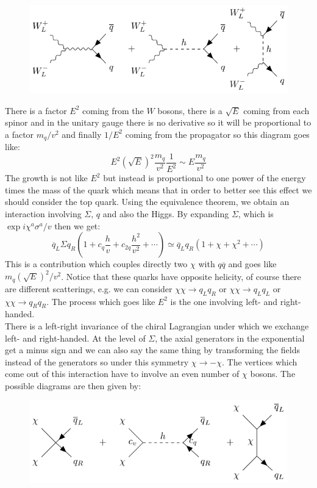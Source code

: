 \documentclass[../main.tex]{subfiles}
\begin{document}
\begin{figure}[h]
    \centering
    \includegraphics{Images/wwqq.pdf}
    \caption*{}
\end{figure}
There is a factor $E^2$ coming from the $W$ bosons, there is a $\sqrt{E}$ coming from each spinor and in the unitary gauge there is no derivative so it will be proportional to a factor $m_q/v^2$ and finally $1/E^2$ coming from the propagator so this diagram goes like:
\[
E^2(\sqrt{E})^2\frac{m_q}{v^2}\frac{1}{E^2}\sim E\frac{m_q}{v^2}
\]
The growth is not like $E^2$ but instead is proportional to one power of the energy times the mass of the quark which means that in order to better see this effect we should consider the top quark. Using the equivalence theorem, we obtain an interaction involving $\Sigma$, $q$ and also the Higgs. By expanding $\Sigma$, which is $\exp{i\chi^a\sigma^a/v}$ then we get:
\[
\overline{q}_L\Sigma q_R\left(1+c_q\frac{h}{v}+c_{2q}\frac{h^2}{v^2}+\cdots\right)\simeq\overline{q}_Lq_R(1+\chi+\chi^2+\cdots)
\]
This is a contribution which couples directly two $\chi$ with $q\overline{q}$ and goes like $m_q(\sqrt{E})^2/v^2$. Notice that these quarks have opposite helicity, of course there are different scatterings, e.g. we can consider $\chi\chi\to q_Lq_R$ or $\chi\chi\to q_Lq_L$ or $\chi\chi\to q_Rq_R$. The process which goes like $E^2$ is the one involving left- and right-handed.\\
There is a left-right invariance of the chiral Lagrangian under which we exchange left- and right-handed. At the level of $\Sigma$, the axial generators in the exponential get a minus sign and we can also say the same thing by transforming the fields instead of the generators so under this symmetry $\chi\to-\chi$. The vertices which come out of this interaction have to involve an even number of $\chi$ bosons. The possible diagrams are then given by:
\begin{figure}[h]
    \centering
    \includegraphics{Images/chichiqq.pdf}
    \caption*{}
\end{figure}\\
\end{document}
